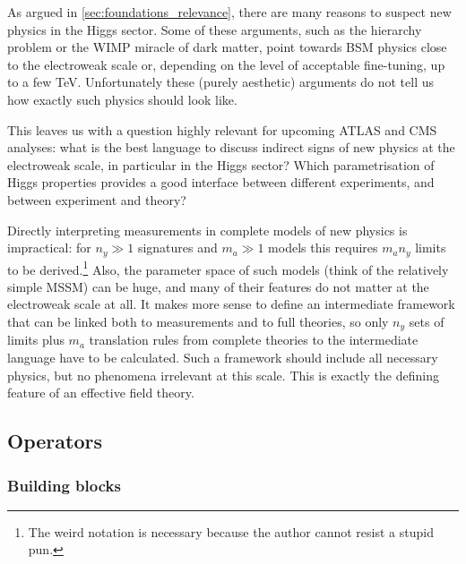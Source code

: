 As argued in \autoref{sec:foundations_relevance}, there are many
reasons to suspect new physics in the Higgs sector. Some of these
arguments, such as the hierarchy problem or the WIMP miracle of dark
matter, point towards BSM physics close to the electroweak scale or,
depending on the level of acceptable fine-tuning, up to a few
TeV. Unfortunately these (purely aesthetic) arguments do not tell us
how exactly such physics should look like.

This leaves us with a question highly relevant for upcoming ATLAS and
CMS analyses: what is the best language to discuss indirect signs of
new physics at the electroweak scale, in particular in the Higgs
sector? Which parametrisation of Higgs properties provides a good
interface between different experiments, and between experiment and
theory?

Directly interpreting measurements in complete models of new physics
is impractical: for $n_y \gg 1$ signatures and $m_a \gg 1$ models this
requires $m_a n_y$ limits to be derived.\footnote{The weird notation
  is necessary because the author cannot resist a stupid pun.} Also,
the parameter space of such models (think of the relatively simple
MSSM) can be huge, and many of their features do not matter at the
electroweak scale at all. It makes more sense to define an
intermediate framework that can be linked both to measurements and to
full theories, so only $n_y$ sets of limits plus $m_a$ translation
rules from complete theories to the intermediate language have to be
calculated. Such a framework should include all necessary physics, but
no phenomena irrelevant at this scale. This is exactly the defining
feature of an effective field theory.




\subsection{Operators}
\label{sec:foundations_heft_operators}

\subsubsection{Building blocks}

